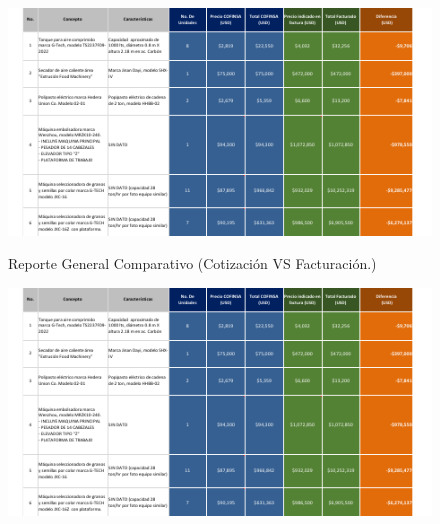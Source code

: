\begin{figure}[hbtp!]
	\centering
	\caption{Reporte General Comparativo (Cotización VS Facturación.)}
	\includegraphics[width=  \linewidth,page=1]{../0.imagenes/CAP_3/cap_3}
	\label{fig:comparartivo}
\end{figure}
\newpage
\begin{figure}[hbtp!]
	\centering
	\includegraphics[width=  \linewidth,page=2]{../0.imagenes/CAP_3/cap_3}
\end{figure}

